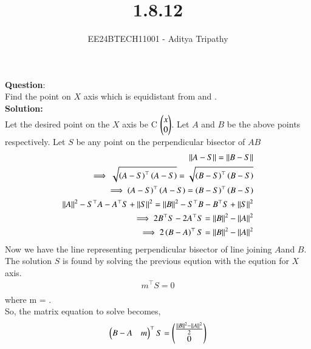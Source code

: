 \documentclass[journal]{IEEEtran}
\begin{document}

\vspace{3cm}

\title{1.8.12}
\author{EE24BTECH11001 - Aditya Tripathy
}
 \maketitle
{\let\newpage\relax\maketitle}

\renewcommand{\thefigure}{\theenumi}
\renewcommand{\thetable}{\theenumi}
\setlength{\intextsep}{10pt} %


\renewcommand{\thetable}{\theenumi}


\textbf{Question}:\\
Find the point on $X$ axis which is equidistant from  and .
\\
\textbf{Solution: }\\
Let the desired point on the $X$ axis be C $\begin{pmatrix}x \\ 0\end{pmatrix}$. Let $A$ and $B$ be the above points respectively.
Let $S$ be any point on the perpendicular bisector of $AB$
\begin{align} 
    ||A-S|| = ||B-S||\\
    \implies \sqrt{\left(A-S\right)^\top \left(A-S\right)} =  \sqrt{\left(B-S\right)^\top \left(B-S\right)} \\
    \implies  \left(A-S\right)^\top \left(A-S\right) = \left(B-S\right)^\top \left(B-S\right) \\
    ||A||^2 - S^\top A - A^\top S + ||S||^2 =  ||B||^2 - S^\top B - B^\top S + ||S||^2 \\
    \implies 2B^\top S - 2A^\top S = ||B||^2 - ||A||^2\\
    \implies 2\left(B-A\right)^\top S = ||B||^2 - ||A||^2 \\
\end{align}
Now we have the line representing perpendicular bisector of line joining $A$and $B$.
The solution $S$ is found by solving the previous eqution with the eqution for $X$ axis.
\begin{align}
    m^\top S = 0\\
\end{align}
where m = .\\
So, the matrix equation to solve becomes,
\begin{align}
    \begin{pmatrix}B-A &  m\end{pmatrix}^\top S = \begin{pmatrix}\frac{||B||^2 - ||A||^2}{2}\\ 0\end{pmatrix}
\end{align}
\end{document}
